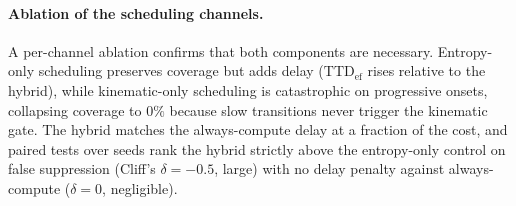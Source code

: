 \paragraph{Ablation of the scheduling channels.}
A per-channel ablation confirms that both components are necessary.
Entropy-only scheduling preserves coverage but adds delay
($\mathrm{TTD}_{\mathrm{ef}}$ rises relative to the hybrid), while
kinematic-only scheduling is catastrophic on progressive onsets, collapsing
coverage to $0\%$ because slow transitions never trigger the kinematic gate.
The hybrid matches the always-compute delay at a fraction of the cost, and
paired tests over seeds rank the hybrid strictly above the entropy-only
control on false suppression (Cliff's $\delta = -0.5$, large) with no delay
penalty against always-compute ($\delta = 0$, negligible).
